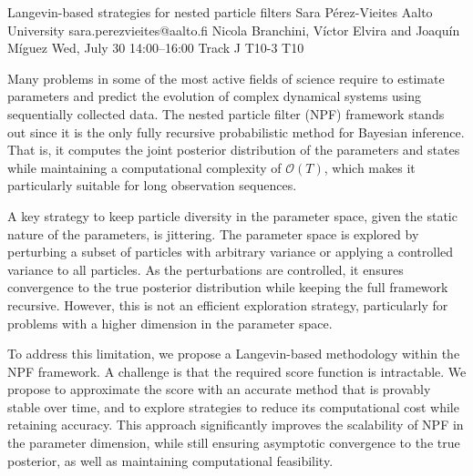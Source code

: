 \begin{talk}
  {Langevin-based strategies for nested particle filters}%
  {Sara Pérez-Vieites}%
  {Aalto University}%
  {sara.perezvieites@aalto.fi}%
  {Nicola Branchini, Víctor Elvira and Joaquín Míguez}%
  {}%
  {Wed, July 30 14:00–16:00 Track J}%
  {T10-3}%
  {T10}%
  
				
			
Many problems in some of the most active fields of science require to estimate parameters and predict the evolution of complex dynamical systems using sequentially collected data. The nested particle filter (NPF) framework stands out since it is the only fully recursive probabilistic method for Bayesian inference. That is, it computes the joint posterior distribution of the parameters and states while maintaining a computational complexity of $\mathcal{O}(T)$, which makes it particularly suitable for long observation sequences. 

A key strategy to keep particle diversity in the parameter space, given the static nature of the parameters, is jittering. The parameter space is explored by perturbing a subset of particles with arbitrary variance or applying a controlled variance to all particles. As the perturbations are controlled, it ensures convergence to the true posterior distribution while keeping the full framework recursive. However, this is not an efficient exploration strategy, particularly for problems with a higher dimension in the parameter space.

To address this limitation, we propose a Langevin-based methodology within the NPF framework. A challenge is that the required score function is intractable. We propose to approximate the score with an accurate method that is provably stable over time, and to explore strategies to reduce its computational cost while retaining accuracy.
This approach significantly improves the scalability of NPF in the parameter dimension, while still ensuring asymptotic convergence to the true posterior, as well as maintaining computational feasibility.

\medskip




\end{talk}
